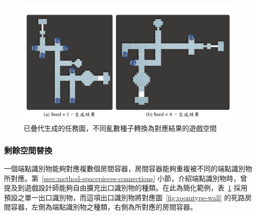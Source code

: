 \begin{figure}[!htb]
  \begin{center}
    \includegraphics[width=1.0\textwidth]{figures/mission-to-space-instruction-result.pdf}
    \caption{已疊代生成的任務圖，不同亂數種子轉換為對應結果的遊戲空間} 
    \label{fig:mission-to-space-instruction-result}
  \end{center}
\end{figure}

\subsubsection{剩餘空間替換}
\label{sssec:method-spacepieces-frommissiontospace-replacement}

一個端點識別物能夠對應複數個房間容器，房間容器能夠重複被不同的端點識別物所對應。第~\ref{ssec:method-spacepieces-connections} 小節，介紹端點識別物時，曾提及到遊戲設計師能夠自由擴充出口識別物的種類。在此為簡化範例，表~\ref{fig:mission-to-space-instruction-result} 採用預設之單一出口識別物，而這項出口識別物將對應圖~\ref{fig:roomtype-wall} 的死路房間容器，左側為端點識別物之種類，右側為所對應的房間容器。

